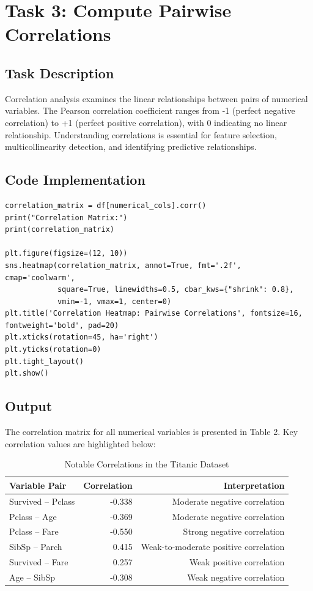 \documentclass[12pt,a4paper]{article}
\begin{document}
\newpage

\section{Task 3: Compute Pairwise Correlations}

\subsection{Task Description}

Correlation analysis examines the linear relationships between pairs of numerical variables. The Pearson correlation coefficient ranges from -1 (perfect negative correlation) to +1 (perfect positive correlation), with 0 indicating no linear relationship. Understanding correlations is essential for feature selection, multicollinearity detection, and identifying predictive relationships.

\subsection{Code Implementation}

\begin{lstlisting}
correlation_matrix = df[numerical_cols].corr()
print("Correlation Matrix:")
print(correlation_matrix)

plt.figure(figsize=(12, 10))
sns.heatmap(correlation_matrix, annot=True, fmt='.2f', cmap='coolwarm',
            square=True, linewidths=0.5, cbar_kws={"shrink": 0.8},
            vmin=-1, vmax=1, center=0)
plt.title('Correlation Heatmap: Pairwise Correlations', fontsize=16, fontweight='bold', pad=20)
plt.xticks(rotation=45, ha='right')
plt.yticks(rotation=0)
plt.tight_layout()
plt.show()
\end{lstlisting}

\subsection{Output}

The correlation matrix for all numerical variables is presented in Table 2. Key correlation values are highlighted below:

\begin{table}[H]
\centering
\small
\begin{tabular}{l|r|r}
\toprule
\textbf{Variable Pair} & \textbf{Correlation} & \textbf{Interpretation} \\
\midrule
Survived -- Pclass & -0.338 & Moderate negative correlation \\
Pclass -- Age & -0.369 & Moderate negative correlation \\
Pclass -- Fare & -0.550 & Strong negative correlation \\
SibSp -- Parch & 0.415 & Weak-to-moderate positive correlation \\
Survived -- Fare & 0.257 & Weak positive correlation \\
Age -- SibSp & -0.308 & Weak negative correlation \\
\bottomrule
\end{tabular}
\caption{Notable Correlations in the Titanic Dataset}
\end{table}
\end{document}
